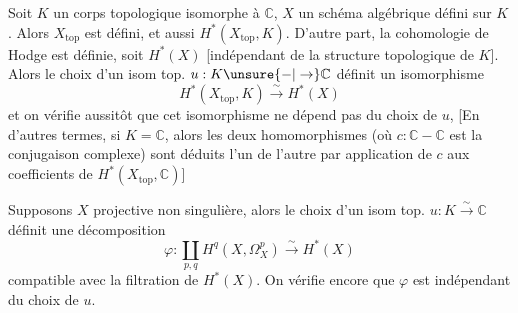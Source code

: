 
Soit $K$ un corps topologique isomorphe à $\mathbb C$, $X$ un
schéma algébrique défini sur $K$. Alors $X_{\mathrm{top}}$ est défini,
et aussi $H^*(X_{\mathrm{top}},K)$. D'autre part,  la cohomologie
de Hodge est définie, soit $H^*(X)$ [indépendant de
la structure topologique de $K$]. Alors le choix
d'un isom top. $u:K\unsure{-|\to}\mathbb C$ définit un isomorphisme
\[
H^*(X_{\mathrm{top}},K)\xrightarrow{\sim} H^*(X)
\]
et on vérifie aussitôt que cet isomorphisme ne
dépend pas du choix de $u$, [En d'autres termes,
si $K=\mathbb C$, alors les deux homomorphismes
(où $c:\mathbb C-\mathbb C$ est la conjugaison complexe)
sont  déduits
l'un de l'autre par application de $c$ aux coefficients de $H^*(X_{\mathrm{top}},\mathbb C)$]


Supposons $X$ projective non singulière, alors
le choix d'un isom top. $u:K\xrightarrow{\sim}\mathbb C$ définit
une décomposition
\[
\varphi:\coprod_{p,q}H^q(X,\Omega_X^p)\xrightarrow{\sim}H^*(X)
\]
compatible avec la filtration de $H^*(X)$. On
vérifie encore que $\varphi$ est indépendant du choix de $u$.
